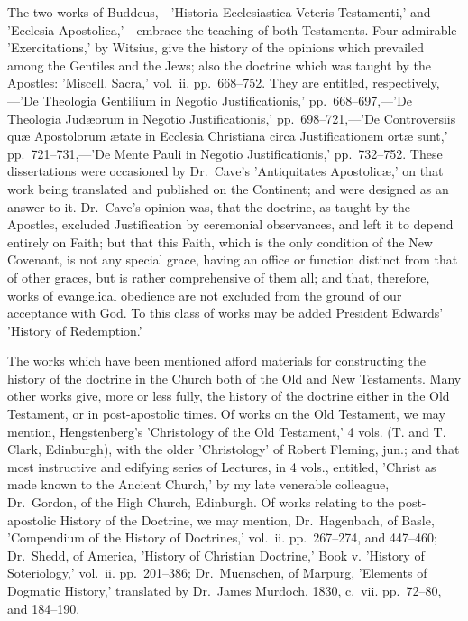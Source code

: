 \documentclass[
]{book}
\begin{document}
{  The two works of Buddeus,---'Historia Ecclesiastica Veteris Testamenti,' and 'Ecclesia Apostolica,'---embrace the teaching of both Testaments. Four admirable 'Exercitations,' by Witsius, give the history of the opinions which prevailed among the Gentiles and the Jews; also the doctrine which was taught by the Apostles: 'Miscell. Sacra,' vol.~ii. pp.~668--752. They are entitled, respectively,---'De Theologia Gentilium in Negotio Justificationis,' pp.~668--697,---'De Theologia Judæorum in Negotio Justificationis,' pp.~698--721,---'De Controversiis quæ Apostolorum ætate in Ecclesia Christiana circa Justificationem ortæ sunt,' pp.~721--731,---'De Mente Pauli in Negotio Justificationis,' pp.~732--752. These dissertations were occasioned by Dr.~Cave's 'Antiquitates Apostolicæ,' on that work being translated and published on the Continent; and were designed as an answer to it. Dr.~Cave's opinion was, that the doctrine, as taught by the Apostles, excluded Justification by ceremonial observances, and left it to depend entirely on Faith; but that this Faith, which is the only condition of the New Covenant, is not any special grace, having an office or function distinct from that of other graces, but is rather comprehensive of them all; and that, therefore, works of evangelical obedience are not excluded from the ground of our acceptance with God. To this class of works may be added President Edwards' 'History of Redemption.'

  The works which have been mentioned afford materials for constructing the history of the doctrine in the Church both of the Old and New Testaments. Many other works give, more or less fully, the history of the doctrine either in the Old Testament, or in post-apostolic times. Of works on the Old Testament, we may mention, Hengstenberg's 'Christology of the Old Testament,' 4 vols. (T. and T. Clark, Edinburgh), with the older 'Christology' of Robert Fleming, jun.; and that most instructive and edifying series of Lectures, in 4 vols., entitled, 'Christ as made known to the Ancient Church,' by my late venerable colleague, Dr.~Gordon, of the High Church, Edinburgh. Of works relating to the post-apostolic History of the Doctrine, we may mention, Dr.~Hagenbach, of Basle, 'Compendium of the History of Doctrines,' vol.~ii. pp.~267--274, and 447--460; Dr.~Shedd, of America, 'History of Christian Doctrine,' Book v. 'History of Soteriology,' vol.~ii. pp.~201--386; Dr.~Muenschen, of Marpurg, 'Elements of Dogmatic History,' translated by Dr.~James Murdoch, 1830, c.~vii. pp.~72--80, and 184--190.

}
\end{document}
